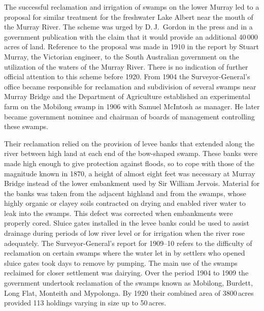 The successful reclamation and irrigation of swamps on the lower
Murray led to a proposal for similar treatment for the freshwater Lake
Albert near the mouth of the Murray River.  The scheme was urged by
D.\,J.~Gordon  in the press and in a government
publication with the claim that it would provide an additional
40\,000\,acres of land.  Reference to the proposal was made in 1910 in
the report by Stuart Murray,  the Victorian
engineer, to the South Australian government on the utilization of the
waters of the Murray River. There is no indication of further official
attention to this scheme before 1920.  From 1904 the
Surveyor-General's office became responsible for reclamation and
subdivision of several swamps near Murray
Bridge and the Department of Agriculture established an experimental
farm on the Mobilong swamp  in 1906 with Samuel
McIntosh  as manager.  He later became government
nominee and chairman of boards of management controlling these swamps.

Their reclamation relied on the provision of levee banks that
extend\-ed along the river between high land at each end of the
bow-shaped swamp.  These banks were made high enough to give
protection against floods, so to cope with those of the
magnitude known in 1870, a height of almost eight feet was necessary
at Murray Bridge  instead of the lower
embankment used by Sir William Jervois.  Material for the banks was
taken from the adjacent highland and from the swamps, whose highly
organic or clayey soils contracted on drying and enabled river water
to leak into the swamps.  This defect was corrected when embankments
were properly cored.  Sluice gates installed in the levee banks could
be used to assist drainage during periods of low river
level or for irrigation when the river rose adequately. The
Surveyor-General's report for 1909--10 refers to the difficulty of
reclamation on certain swamps where the water let in by settlers who
opened sluice gates took days
to remove by pumping.  The main use of the swamps reclaimed for closer
settlement was dairying.  Over the period 1904 to 1909
the government undertook reclamation of the swamps known as Mobilong,
Burdett, Long Flat, Monteith and Mypolonga.  By 1920 their combined
area of 3800\,acres provided 113 holdings varying in size up to
50\,acres.

